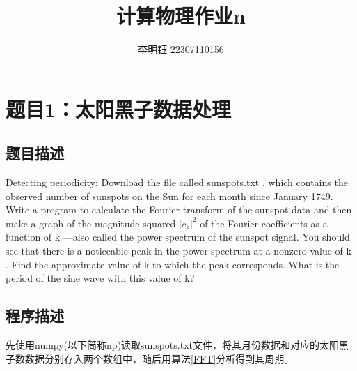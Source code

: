 \documentclass[11pt]{article}
\author{李明钰 22307110156}
\title{计算物理作业n}
\begin{document}
\maketitle


\section{题目1：太阳黑子数据处理}
\subsection{题目描述}
Detecting periodicity: Download the file called sunspots.txt , which contains the observed number of sunspots on the Sun for each month since January 1749. Write a program to calculate the Fourier transform of the sunspot data and then make a graph of the magnitude squared $|c_k|^2$
 of the Fourier coefficients as a function of k
 —also called the power spectrum of the sunspot signal. You should see that there is a noticeable peak in the power spectrum at a nonzero value of k
. Find the approximate value of k
 to which the peak corresponds. What is the period of the sine wave with this value of k?


\subsection{程序描述}
先使用numpy(以下简称np)读取sunspots.txt文件，将其月份数据和对应的太阳黑子数数据分别存入两个数组中，随后用算法\ref{FFT}分析得到其周期。
\end{document}
